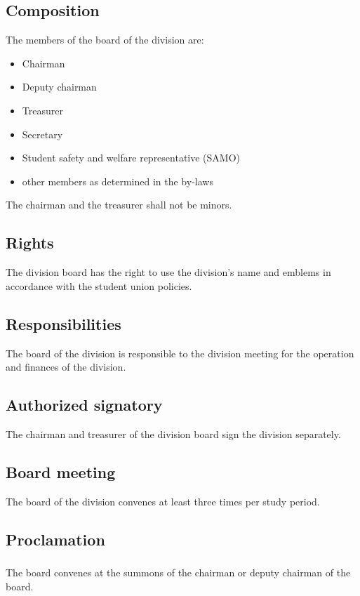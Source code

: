 \documentclass[a4paper]{dtek}
\begin{document}
\subsection{Composition}
The members of the board of the division are: 
\begin{itemize}
    \item Chairman
    \item Deputy chairman
    \item Treasurer
    \item Secretary
    \item Student safety and welfare representative (SAMO)
    \item other members as determined in the by-laws
\end{itemize}

The chairman and the treasurer shall not be minors. 

\subsection{Rights}
The division board has the right to use the division's name and emblems in accordance with the student union policies. 

\subsection{Responsibilities}
The board of the division is responsible to the division meeting for the operation and finances of the division. 

\subsection{Authorized signatory}
The chairman and treasurer of the division board sign the division separately. 


\subsection{Board meeting}
The board of the division convenes at least three times per study period. 

\subsection{Proclamation}
\subsubsection{}
The board convenes at the summons of the chairman or deputy chairman of the board.
\end{document}
